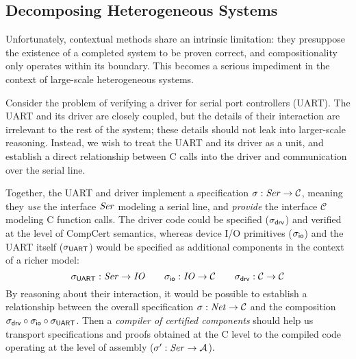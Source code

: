 \subsection{Decomposing Heterogeneous Systems}
\label{ssec:intro-dhs}

Unfortunately, contextual methods share an intrinsic limitation: they
presuppose the existence of a completed system to be proven correct,
and compositionality only operates within its boundary.  This becomes
a serious impediment in the context of large-scale heterogeneous
systems.

\begin{example} \label{ex:nicdriver} 
Consider the problem of verifying a driver
for serial port controllers (UART).
The UART and its driver are closely coupled, but the details
of their interaction are irrelevant to the rest of the system; these
details should not leak into larger-scale reasoning.  Instead, we
wish to treat the UART and its driver as a unit, and establish a direct
relationship between C calls into the driver and
communication over the serial line.

Together, the UART and driver implement a specification
$\sigma : \mathit{Ser} \rightarrow \mathcal{C}$, meaning they \emph{use}
the interface $\mathit{Ser}$ modeling a serial line, and \emph{provide} the
interface $\mathcal{C}$ modeling C function calls.
The driver code could be specified ($\sigma_{ \mathsf{drv} }$) and verified at
the level of CompCert semantics, whereas device I/O primitives
($\sigma_{ \mathsf{io} }$) and the UART itself ($\sigma_{ \mathsf{UART} }$) would be
specified as additional components in the context of a richer model:
\[
  \sigma_{ \mathsf{UART} } : \mathit{Ser} \rightarrow \mathit{IO}
  \qquad
  \sigma_{ \mathsf{io} } : \mathit{IO} \rightarrow \mathcal{C}
  \qquad
  \sigma_{ \mathsf{drv} } : \mathcal{C} \rightarrow \mathcal{C}
\]
By reasoning about their interaction, it would be possible to
establish a relationship between the overall specification $\sigma :
\mathit{Net} \rightarrow \mathcal{C}$ and the composition $\sigma_{ \mathsf{drv} }
\circ \sigma_{ \mathsf{io} } \circ \sigma_{ \mathsf{UART} }$.  Then a \emph{compiler of
certified components} should help us transport specifications and
proofs obtained at the C level to
the compiled code operating at the level of assembly ($\sigma' :
\mathit{Ser} \rightarrow \mathcal{A}$).
\end{example}

